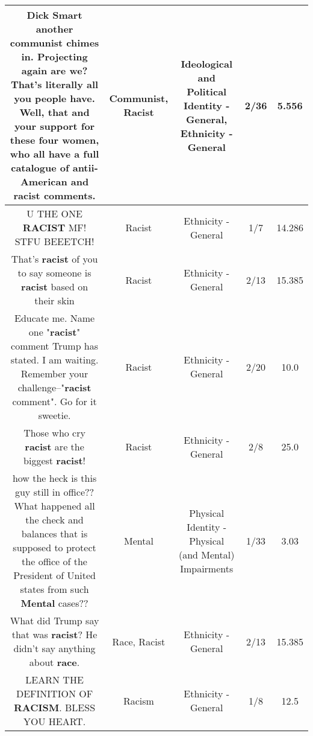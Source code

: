 \documentclass[11pt]{article}
\newlength\mylength
\begin{document}
\begin{center}
\begin{longtable}{|C{.65\mylength}|C{.30\mylength}|C{.12\mylength}|C{.12\mylength}|C{.12\mylength}|}
  \small Dick Smart another \textbf{communist} chimes in. Projecting again are we?  That's literally all you people have. Well, that and your support for these four women, who all have a full catalogue of antii-American and \textbf{racist} comments.\normalsize   & Communist, Racist &  Ideological and Political Identity - General, Ethnicity - General & 2/36 & 5.556 \\  \hline
  \small U THE ONE \textbf{RACIST} MF! STFU BEEETCH!\normalsize   & Racist & Ethnicity - General & 1/7 & 14.286 \\  \hline
  \small That's \textbf{racist} of you to say someone is \textbf{racist} based on their skin\normalsize   & Racist & Ethnicity - General & 2/13 & 15.385 \\  \hline
  \small Educate me. Name one "\textbf{racist}"  comment Trump has stated.  I am waiting. Remember your challenge--"\textbf{racist} comment". Go for it sweetie.\normalsize   & Racist & Ethnicity - General & 2/20 & 10.0 \\  \hline
  \small Those who cry \textbf{racist} are the biggest \textbf{racist}!\normalsize   & Racist & Ethnicity - General & 2/8 & 25.0 \\  \hline
  \small how the heck is this guy still in office?? What happened all the check and balances that is supposed to protect the office of the President of United states from such \textbf{Mental} cases??\normalsize   & Mental & Physical Identity - Physical (and Mental) Impairments & 1/33 & 3.03 \\  \hline
  \small What did Trump say that was \textbf{racist}? He didn't say anything about \textbf{race}.\normalsize   & Race, Racist & Ethnicity - General & 2/13 & 15.385 \\  \hline
  \small LEARN THE DEFINITION OF \textbf{RACISM}. BLESS YOU HEART.\normalsize   & Racism & Ethnicity - General & 1/8 & 12.5 \\  \hline

\end{longtable}
\end{center}
\end{document}
